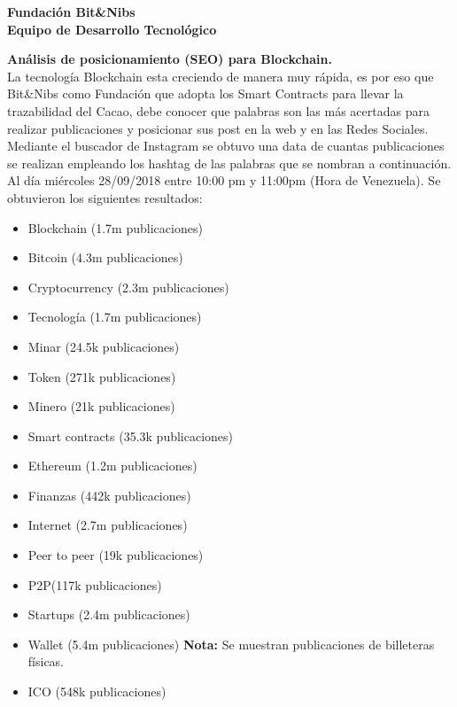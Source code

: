 \documentclass[12pt,letterpaper]{article}
\begin{document}
	\lhead{}
	\chead{}
	\lfoot{}
	\cfoot{}
	
	
	\noindent \Large \textbf{Fundación Bit\&Nibs}\\
	\noindent \textbf{Equipo de Desarrollo Tecnológico}\\
	
	\normalsize
	
	 \noindent \textbf{Análisis de posicionamiento (SEO) para Blockchain.}\\
	 
	 \noindent La tecnología Blockchain esta creciendo de manera muy rápida, es por eso que  Bit\&Nibs como Fundación que adopta los Smart Contracts para llevar la trazabilidad del Cacao, debe conocer que palabras son las más acertadas para realizar publicaciones y posicionar sus post en la web y en las  Redes Sociales.\\
	
	\noindent Mediante el buscador de Instagram se obtuvo una data de cuantas publicaciones se realizan empleando los hashtag de las palabras que se nombran a continuación. Al día miércoles 28/09/2018 entre 10:00 pm y 11:00pm (Hora de Venezuela). Se obtuvieron los siguientes resultados:  \\
	
	\begin{itemize}
		\item Blockchain (1.7m publicaciones)
		\item Bitcoin    (4.3m publicaciones)
		\item Cryptocurrency (2.3m publicaciones)
		\item Tecnología  (1.7m publicaciones)
		\item Minar (24.5k publicaciones)
		\item Token (271k publicaciones)
		\item Minero (21k publicaciones)
		\item Smart contracts (35.3k publicaciones)
		\item Ethereum (1.2m publicaciones)
		\item Finanzas (442k publicaciones)
		\item Internet (2.7m publicaciones)
		\item Peer to peer (19k publicaciones)
		\item P2P(117k publicaciones)
		\item Startups (2.4m publicaciones) 
		\item Wallet (5.4m publicaciones) \textbf{Nota:} Se muestran publicaciones de billeteras físicas.
		\item ICO (548k publicaciones)
	\end{itemize}
\end{document}
